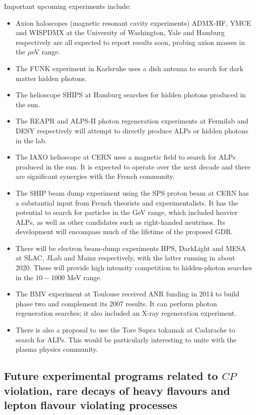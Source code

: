 Important upcoming experiments include:
\begin{itemize}
\item Axion haloscopes (magnetic resonant cavity experiments) ADMX-HF, YMCE and WISPDMX at the University of Washington, Yale and Hamburg respectively are all expected to report results soon, probing axion masses in the $\mu$eV range. 
\item The FUNK experiment in Karlsruhe uses a dish antenna to search for dark matter hidden photons.
\item The helioscope SHIPS at Hamburg searches for hidden photons produced in the sun.
\item The REAPR and ALPS-II photon regeneration experiments at Fermilab and DESY respectively will attempt to directly produce ALPs or hidden photons in the lab.
\item The IAXO helioscope at CERN uses a magnetic field to search for ALPs produced in the sun. It is expected to operate over the next decade and there are significant synergies with the French community.
\item The SHIP  beam dump experiment using the SPS proton beam at CERN has a substantial input from French theorists and experimentalists. It has the potential to search for particles in the GeV range, which included heavier ALPs, as well as other candidates such as right-handed neutrinos. Its development will encompass much of the lifetime of the proposed GDR.
\item There will be electron beam-dump experiments HPS, DarkLight and MESA at SLAC, JLab and Mainz respectively, with the latter running in about 2020. These will provide high intensity competition to hidden-photon searches in the $10-1000$ MeV range.
\item The BMV experiment at Toulouse received ANR funding in 2014 to build phase two and complement its 2007 results. It can perform photon regeneration searches; it also included an X-ray regeneration experiment.
\item There is also a proposal to use the Tore Supra tokamak at Cadarache to search for ALPs. This would be particularly interesting to unite with the plasma physics community. 
\end{itemize}





\subsection{Future experimental programs related to $CP$ violation, rare decays of heavy flavours and lepton flavour violating processes}   

